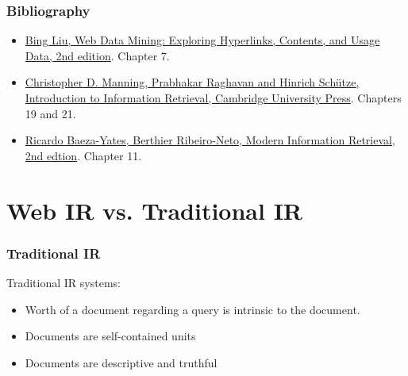 \documentclass{beamer}
\subtitle{Web Retrieval and Link Analysis}
\begin{document}
\maketitle


\begin{frame}
    \frametitle{Bibliography}
    
    \begin{block}{}
        \begin{itemize}
        \item \href{http://www.cs.uic.edu/~liub/WebMiningBook.html}{Bing Liu,
              Web Data Mining: Exploring Hyperlinks, Contents, and Usage Data,
              2nd edition}. Chapter 7.
        \item \href{http://www.cse.iitb.ac.in/soumen/mining-the-web/}{Christopher D. Manning, Prabhakar Raghavan and Hinrich Schütze, Introduction to Information Retrieval, Cambridge University Press}. Chapters 19 and 21.
        \item \href{http://www.mir2ed.org/}{Ricardo Baeza-Yates, Berthier
              Ribeiro-Neto, Modern Information Retrieval, 2nd edtion}. Chapter
            11.
        \end{itemize}
    \end{block}

\end{frame}

\section{Web IR vs. Traditional IR}

\begin{frame}
  \frametitle{Traditional IR}

  Traditional IR systems:
  \begin{itemize}
  \item Worth of a document regarding a query is intrinsic to the document.
  \item Documents are self-contained units
  \item Documents are descriptive and truthful
  \end{itemize}

\end{frame}

\end{document}
